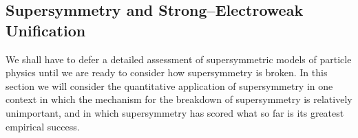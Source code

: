 
\subsection{Supersymmetry and Strong--Electroweak Unification}

We shall have to defer a detailed assessment of supersymmetric models of
particle physics until we are ready to consider how supersymmetry is broken.
In this section we will consider the quantitative application of
supersymmetry in one context in which the mechanism for the breakdown of
supersymmetry is relatively unimportant, and in which supersymmetry has
scored what so far is its greatest empirical success.

